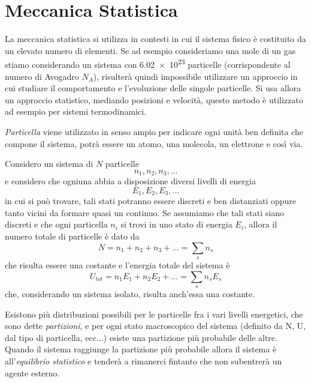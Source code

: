
\section{Meccanica Statistica}
La meccanica statistica si utilizza in contesti in cui il sistema fisico è costituito da un elevato numero di elementi.
Se ad esempio consideriamo una mole di un gas stiamo considerando un sistema con \SI{6.02e23}{} particelle (corrispondente al numero di Avogadro $N_A$), risulterà quindi impossibile utilizzare un approccio in cui studiare il comportamento e l'evoluzione delle singole particelle.
Si usa allora un approccio statistico, mediando posizioni e velocità, questo metodo è utilizzato ad esempio per sistemi termodinamici.

\textit{Particella} viene utilizzato in senso ampio per indicare ogni unità ben definita che compone il sistema, potrà essere un atomo, una molecola, un elettrone e così via.

Considero un sistema di $N$ particelle
\begin{equation}
n_1,n_2,n_3, ...
\end{equation}
e considero che ogniuna abbia a disposizione diversi livelli di energia 
\begin{equation}
E_1,E_2,E_3, ...
\end{equation}
in cui si può trovare, tali stati potranno essere discreti e ben distanziati oppure tanto vicini da formare quasi un continuo.
Se assumiamo che tali stati siano discreti e che ogni particella $n_i$ si trovi in uno stato di energia $E_i$, allora il numero totale di particelle è dato da
\begin{equation}
N = n_1 + n_2 + n_3 + ... = \sum_s n_s
\end{equation}
che risulta essere una costante e l'energia totale del sistema è
\begin{equation}
U_{tot} = n_1 E_1 + n_2 E_2 + ... = \sum_s n_s E_s
\end{equation}
che, considerando un sistema isolato, risulta anch'essa una costante.

Esistono più distribuzioni possibili per le particelle fra i vari livelli energetici, che sono dette \textit{partizioni}, e per ogni stato macroscopico del sistema (definito da N, U, dal tipo di particella, ecc...) esiste una partizione più probabile delle altre.
Quando il sistema raggiunge la partizione più probabile allora il sistema è all'\textit{equilibrio statistico} e tenderà a rimanerci fintanto che non subentrerà un agente esterno.

